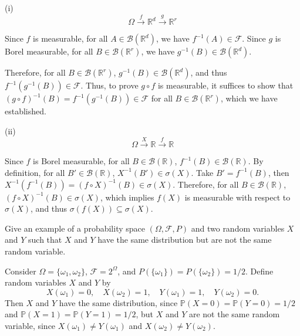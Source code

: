 \documentclass[11pt]{article}
\begin{document}
\begin{solution}

  (i)
    \[
    \Omega \xrightarrow{f} \mathbb{R}^d \xrightarrow{g} \mathbb{R}^r
  \]

  Since $f$ is measurable, for all $A \in \mathcal{B}(\mathbb{R}^d)$, we have $f^{-1}(A) \in \mathcal{F}$. Since $g$ is Borel measurable, for all $B \in \mathcal{B}(\mathbb{R}^r)$, we have $g^{-1}(B) \in \mathcal{B}(\mathbb{R}^d)$. 
  
  Therefore, for all $B \in \mathcal{B}(\mathbb{R}^r)$, $g^{-1}(B) \in \mathcal{B}(\mathbb{R}^d)$, and thus $f^{-1}(g^{-1}(B)) \in \mathcal{F}$. Thus, to prove $g \circ f$ is measurable, it suffices to show that $(g \circ f)^{-1}(B) = f^{-1}(g^{-1}(B)) \in \mathcal{F}$ for all $B \in \mathcal{B}(\mathbb{R}^r)$, which we have established.

  (ii)
  \[
    \Omega \xrightarrow{X} \mathbb{R} \xrightarrow{f} \mathbb{R}
  \]

  Since $f$ is Borel measurable, for all $B \in \mathcal{B}(\mathbb{R})$, $f^{-1}(B) \in \mathcal{B}(\mathbb{R})$. By definition, for all $B' \in \mathcal{B}(\mathbb{R})$, $X^{-1}(B') \in \sigma(X)$. Take $B' = f^{-1}(B)$, then $X^{-1}(f^{-1}(B)) = (f \circ X)^{-1}(B) \in \sigma(X)$. Therefore, for all $B \in \mathcal{B}(\mathbb{R})$, $(f \circ X)^{-1}(B) \in \sigma(X)$, which implies $f(X)$ is measurable with respect to $\sigma(X)$, and thus $\sigma(f(X)) \subseteq \sigma(X)$.

\end{solution}

\begin{problem}[10]
Give an example of a probability space $(\Omega,\mathcal{F},P)$ and two random variables $X$
and $Y$ such that $X$ and $Y$ have the same distribution but are not the same random variable.
\end{problem}

\begin{solution}
  
  Consider $\Omega = \{\omega_1, \omega_2\}$, $\mathcal{F} = 2^\Omega$, and $P(\{\omega_1\}) = P(\{\omega_2\}) = 1/2$. Define random variables $X$ and $Y$ by
  \[
    X(\omega_1) = 0, \quad X(\omega_2) = 1, \quad Y(\omega_1) = 1, \quad Y(\omega_2) = 0.
  \]
  Then $X$ and $Y$ have the same distribution, since $\mathbb{P}(X = 0) = \mathbb{P}(Y = 0) = 1/2$ and $\mathbb{P}(X = 1) = \mathbb{P}(Y = 1) = 1/2$, but $X$ and $Y$ are not the same random variable, since $X(\omega_1) \neq Y(\omega_1)$ and $X(\omega_2) \neq Y(\omega_2)$.
\end{solution}
\end{document}
